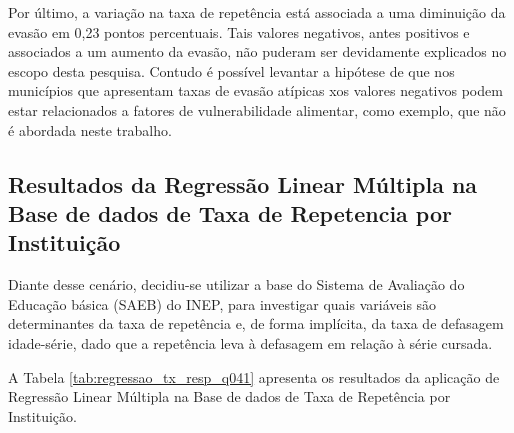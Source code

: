\documentclass[english, spanish, brazilian]{RBIEarticle} %
\begin{document}
Por último, a variação na taxa de repetência está associada a uma diminuição da evasão em 0,23 pontos percentuais. Tais valores negativos, antes positivos e associados a um aumento da evasão, não puderam ser devidamente explicados no escopo desta pesquisa. Contudo é possível levantar a hipótese de que nos municípios que apresentam taxas de evasão atípicas xos valores negativos podem estar relacionados a fatores de vulnerabilidade alimentar, como exemplo, que não é abordada neste trabalho.

\subsection{Resultados da Regressão Linear Múltipla na Base de dados de Taxa de Repetencia por Instituição}

Diante desse cenário, decidiu-se utilizar a base do Sistema de Avaliação do Educação básica (SAEB) do INEP, para investigar quais variáveis são determinantes da taxa de repetência e, de forma implícita, da taxa de defasagem idade-série, dado que a repetência leva à defasagem em relação à série cursada.

A Tabela \ref{tab:regressao_tx_resp_q041} apresenta os resultados da aplicação de Regressão Linear Múltipla na Base de dados de Taxa de Repetência por Instituição.
\end{document}
